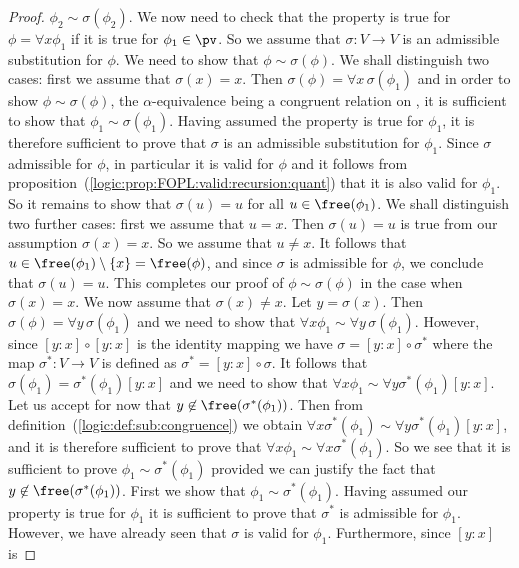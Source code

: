 \begin{proof}
$\phi_{2}\sim\sigma(\phi_{2})$. We now need to check that the
property is true for $\phi=\forall x\phi_{1}$ if it is true for
$\phi_{1}\in\pv$. So we assume that $\sigma:V\to V$ is an admissible
substitution for $\phi$. We need to show that
$\phi\sim\sigma(\phi)$. We shall distinguish two cases: first we
assume that $\sigma(x)=x$. Then $\sigma(\phi)=\forall
x\,\sigma(\phi_{1})$ and in order to show $\phi\sim\sigma(\phi)$,
the $\alpha$-equivalence being a congruent relation on \pv, it is
sufficient to show that $\phi_{1}\sim\sigma(\phi_{1})$. Having
assumed the property is true for $\phi_{1}$, it is therefore
sufficient to prove that $\sigma$ is an admissible substitution for
$\phi_{1}$. Since $\sigma$ admissible for $\phi$, in particular it
is valid for $\phi$ and it follows from
proposition~(\ref{logic:prop:FOPL:valid:recursion:quant}) that it is
also valid for $\phi_{1}$. So it remains to show that $\sigma(u)=u$
for all $u\in\free(\phi_{1})$. We shall distinguish two further
cases: first we assume that $u=x$. Then $\sigma(u)=u$ is true from
our assumption $\sigma(x)=x$. So we assume that $u\neq x$. It
follows that $u\in\free(\phi_{1})\setminus\{x\}=\free(\phi)$, and
since $\sigma$ is admissible for $\phi$, we conclude that
$\sigma(u)=u$. This completes our proof of $\phi\sim\sigma(\phi)$ in
the case when $\sigma(x)=x$. We now assume that $\sigma(x)\neq x$.
Let $y=\sigma(x)$. Then $\sigma(\phi)=\forall y\,\sigma(\phi_{1})$
and we need to show that $\forall x\phi_{1}\sim\forall
y\,\sigma(\phi_{1})$. However, since $[y\!:\!x]\circ[y\!:\!x]$ is
the identity mapping we have $\sigma=[y\!:\!x]\circ\sigma^{*}$ where
the map $\sigma^{*}:V\to V$ is defined as
$\sigma^{*}=[y\!:\!x]\circ\sigma$. It follows that
$\sigma(\phi_{1})=\sigma^{*}(\phi_{1})[y\!:\!x]$ and we need to show
that $\forall x\phi_{1}\sim\forall y\sigma^{*}(\phi_{1})[y\!:\!x]$.
Let us accept for now that $y\not\in\free(\sigma^{*}(\phi_{1}))$.
Then from definition~(\ref{logic:def:sub:congruence}) we obtain
$\forall x\sigma^{*}(\phi_{1})\sim\forall
y\sigma^{*}(\phi_{1})[y\!:\!x]$, and it is therefore sufficient to
prove that $\forall x\phi_{1}\sim\forall x\sigma^{*}(\phi_{1})$. So
we see that it is sufficient to prove
$\phi_{1}\sim\sigma^{*}(\phi_{1})$ provided we can justify the fact
that $y\not\in\free(\sigma^{*}(\phi_{1}))$. First we show that
$\phi_{1}\sim\sigma^{*}(\phi_{1})$. Having assumed our property is
true for $\phi_{1}$ it is sufficient to prove that $\sigma^{*}$ is
admissible for $\phi_{1}$. However, we have already seen that
$\sigma$ is valid for $\phi_{1}$. Furthermore, since $[y\!:\!x]$ is

\end{proof}
